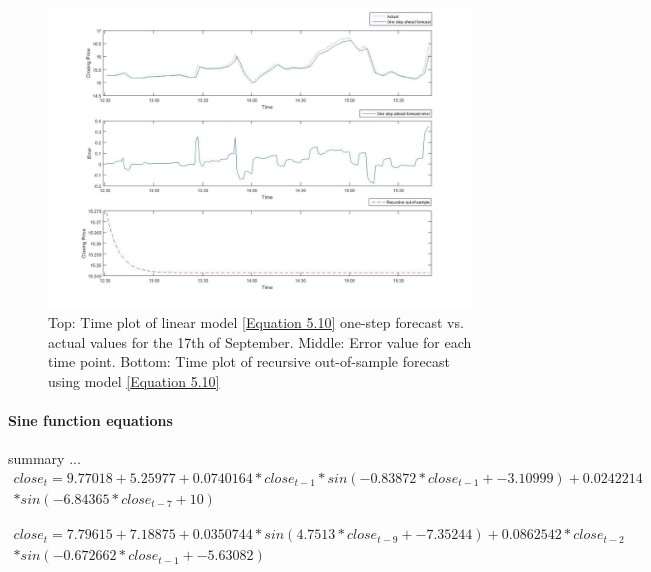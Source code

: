 \documentclass[13pt]{report}
\begin{document}
\begin{figure}[H]
\centering
\label{VWlinear17fig}
\includegraphics[width=\textwidth]{17linear2}
\caption{Top: Time plot of linear model \ref{Equation 5.10} one-step forecast vs. actual values for the 17th of September. Middle: Error value for each time point. Bottom: Time plot of recursive out-of-sample forecast using model \ref{Equation 5.10}}
\end{figure}

\paragraph{Sine function equations}\hfill \break
summary ...
\begin{equation}
\begin{align*}
close_{t} = 9.77018 + 5.25977 + 0.0740164 * close_{t-1} * sin ( -0.83872 * close_{t-1} + -3.10999 ) + 0.0242214\\ * sin ( -6.84365 * close_{t-7} + 10 ) 
\end{align*}
\label{Equation 5.11}
\end{equation}

\begin{equation}
\begin{align*}
close_{t} = 7.79615 + 7.18875 + 0.0350744 * sin ( 4.7513 * close_{t-9} + -7.35244 ) + 0.0862542 * close_{t-2} \\ * sin ( -0.672662 * close_{t-1} + -5.63082 )
\end{align*}
\label{Equation 5.12}
\end{equation}
\end{document}
